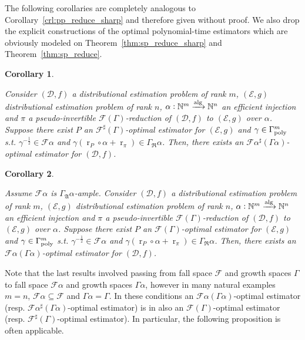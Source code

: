 \documentclass{article}
\numberwithin{equation}{section}
\theoremstyle{definition}
\theoremstyle{plain}
\newtheorem{corollary}{Corollary}[section]
\DeclareMathOperator{\R}{r}
\newcommand{\Nats}{\mathbb{N}}
\newcommand{\Dist}{\mathcal{D}}
\newcommand{\GrowR}{\Gamma_{\mathfrak{R}}}
\newcommand{\GrowA}{\Gamma_{\mathfrak{A}}}
\newcommand{\Fall}{\mathcal{F}}
\newcommand{\EG}{\Fall(\Gamma)}
\newcommand{\ESG}{\Fall^\sharp(\Gamma)}
\newcommand{\GammaPoly}{\Gamma_{\textnormal{poly}}}
\newcommand{\Alg}{\xrightarrow{\textnormal{alg}}}
\begin{document}
The following corollaries are completely analogous to Corollary~\ref{crl:pp_reduce_sharp} and therefore given without proof. We also drop the explicit constructions of the optimal polynomial-time estimators which are obviously modeled on Theorem~\ref{thm:sp_reduce_sharp} and Theorem~\ref{thm:sp_reduce}.

\begin{samepage}
\begin{corollary}
\label{crl:p_reduce_sharp}

Consider $(\Dist,f)$ a distributional estimation problem of rank ${m}$, $(\mathcal{E},g)$ distributional estimation problem of rank ${n}$, ${\alpha: \Nats^m \Alg \Nats^n}$ an efficient injection and $\pi$ a pseudo-invertible $\EG$-reduction of $(\Dist, f)$ to $(\mathcal{E}, g)$ over ${\alpha}$. Suppose there exist ${P}$ an $\ESG$-optimal estimator for $(\mathcal{E}, g)$ and ${\gamma \in \GammaPoly^m}$ s.t. ${\gamma^{-\frac{1}{2}} \in \Fall \alpha}$ and ${\gamma(\R_P \circ \alpha + \R_\pi) \in \GrowR \alpha}$. Then, there exists an $\Fall \alpha^\sharp (\Gamma \alpha)$-optimal estimator for $(\Dist, f)$.


\end{corollary}
\end{samepage}

\begin{samepage}
\begin{corollary}
\label{crl:p_reduce}

Assume ${\Fall \alpha}$ is ${\GrowA \alpha}$-ample. Consider $(\Dist,f)$ a distributional estimation problem of rank ${m}$, $(\mathcal{E},g)$ distributional estimation problem of rank ${n}$, ${\alpha: \Nats^m \Alg \Nats^n}$ an efficient injection and $\pi$ a pseudo-invertible $\EG$-reduction of $(\Dist, f)$ to $(\mathcal{E}, g)$ over ${\alpha}$. Suppose there exist ${P}$ an $\EG$-optimal estimator for $(\mathcal{E}, g)$ and ${\gamma \in \GammaPoly^m}$ s.t. ${\gamma^{-\frac{1}{2}} \in \Fall \alpha}$ and ${\gamma(\R_P \circ \alpha + \R_\pi) \in \GrowR \alpha}$. Then, there exists an $\Fall \alpha (\Gamma \alpha)$-optimal estimator for $(\Dist, f)$.


\end{corollary}
\end{samepage}

Note that the last results involved passing from fall space ${\Fall}$ and growth spaces ${\Gamma}$ to fall space ${\Fall \alpha}$ and growth spaces ${\Gamma \alpha}$, however in many natural examples ${m = n}$, ${\Fall \alpha \subseteq \Fall}$ and ${\Gamma \alpha = \Gamma}$. In these conditions an ${\Fall \alpha (\Gamma \alpha)}$-optimal estimator (resp. ${\Fall \alpha^\sharp(\Gamma \alpha)}$-optimal estimator) is in also an ${\EG}$-optimal estimator (resp. ${\ESG}$-optimal estimator). In particular, the following proposition is often applicable.
\end{document}
